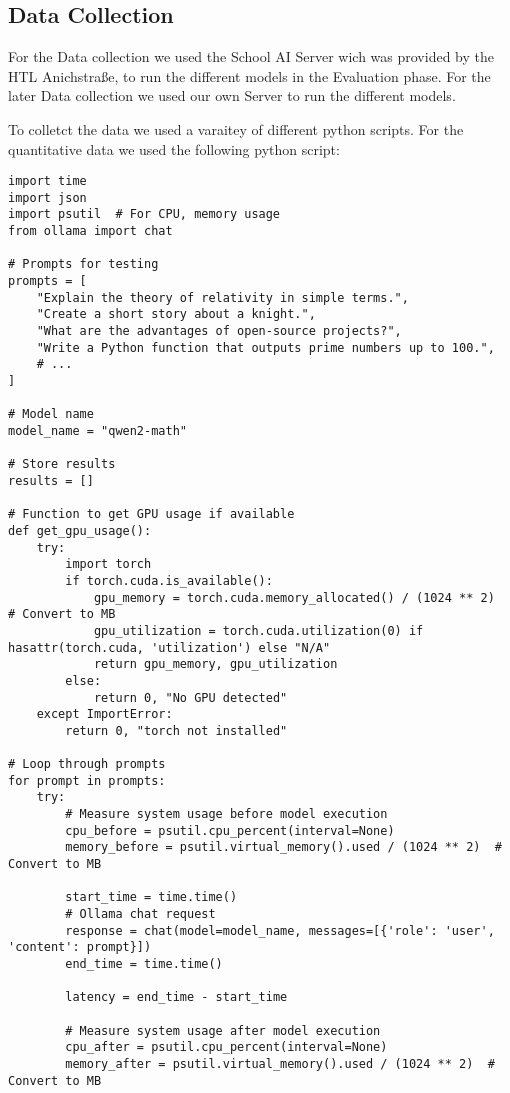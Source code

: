 \cite{Ollama-models-overview}


\subsection{Data Collection}

For the Data collection we used the School AI Server wich was provided by the HTL Anichstraße, to run the different models in the Evaluation phase.
For the later Data collection we used our own Server to run the different models.


To colletct the data we used a varaitey of different python scripts. For the quantitative data we used the following python script:

\begin{lstlisting}[style=Python, caption={Python-quantitative-data-collection}, captionpos=b]
import time
import json
import psutil  # For CPU, memory usage
from ollama import chat

# Prompts for testing
prompts = [
    "Explain the theory of relativity in simple terms.",
    "Create a short story about a knight.",
    "What are the advantages of open-source projects?",
    "Write a Python function that outputs prime numbers up to 100.",
    # ...
]

# Model name
model_name = "qwen2-math"

# Store results
results = []

# Function to get GPU usage if available
def get_gpu_usage():
    try:
        import torch
        if torch.cuda.is_available():
            gpu_memory = torch.cuda.memory_allocated() / (1024 ** 2)  # Convert to MB
            gpu_utilization = torch.cuda.utilization(0) if hasattr(torch.cuda, 'utilization') else "N/A"
            return gpu_memory, gpu_utilization
        else:
            return 0, "No GPU detected"
    except ImportError:
        return 0, "torch not installed"

# Loop through prompts
for prompt in prompts:
    try:
        # Measure system usage before model execution
        cpu_before = psutil.cpu_percent(interval=None)
        memory_before = psutil.virtual_memory().used / (1024 ** 2)  # Convert to MB

        start_time = time.time()
        # Ollama chat request
        response = chat(model=model_name, messages=[{'role': 'user', 'content': prompt}])
        end_time = time.time()

        latency = end_time - start_time

        # Measure system usage after model execution
        cpu_after = psutil.cpu_percent(interval=None)
        memory_after = psutil.virtual_memory().used / (1024 ** 2)  # Convert to MB


\end{lstlisting}
